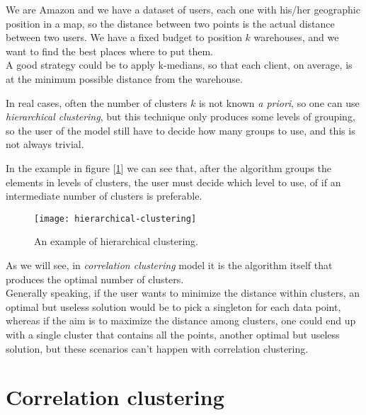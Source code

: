 \begin{ex}
    We are Amazon and we have a dataset of users, each one with his/her geographic position in a map, so the distance between two points is the actual distance between two users. We have a fixed budget to position $k$ warehouses, and we want to find the best places where to put them.\\
    A good strategy could be to apply k-medians, so that each client, on average, is at the minimum possible distance from the warehouse.
\end{ex}

In real cases, often the number of clusters $k$ is not known \textit{a priori}, so one can use \textit{hierarchical clustering}, but this technique only produces some levels of grouping, so the user of the model still have to decide how many groups to use, and this is not always trivial.

\begin{ex}
    In the example in figure [\ref{fig:hierarchical-clustering-ex}] we can see that, after the algorithm groups the elements in levels of clusters, the user must decide which level to use, of if an intermediate number of clusters is preferable.
    
    \begin{figure}[h!]
        \centering
        \texttt{[image: hierarchical-clustering]}
        \caption{An example of hierarchical clustering.}
        \label{fig:hierarchical-clustering-ex}
    \end{figure}
\end{ex}

As we will see, in \textit{correlation clustering} model it is the algorithm itself that produces the optimal number of clusters.\\ Generally speaking, if the user wants to minimize the distance within clusters, an optimal but useless solution would be to pick a singleton for each data point, whereas if the aim is to maximize the distance among clusters, one could end up with a single cluster that contains all the points, another optimal but useless solution, but these scenarios can't happen with correlation clustering.


\section{Correlation clustering}\label{sec:corr-clust}

